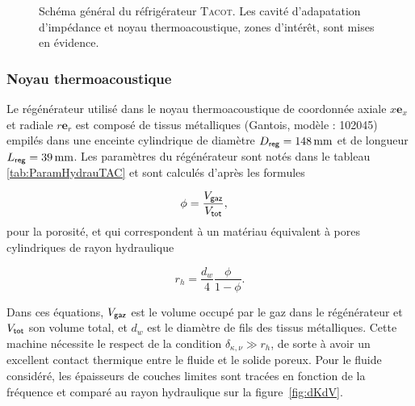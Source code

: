 \begin{figure}[!ht]
    \centering
    
    \caption[Schéma général du réfrigérateur \textsc{Tacot} et mise en évidence des zones d'intérêt pour cette thèse]{Schéma général du réfrigérateur \textsc{Tacot}. Les \colorbox{MatlabYellow}{cavité d'adapatation d'impédance} et \colorbox{MatlabOrange}{noyau thermoacoustique}, zones d'intérêt, sont mises en évidence.}
    \label{fig:SchemaGeneralTACOT}
\end{figure}



\subsubsection{Noyau thermoacoustique}

Le régénérateur utilisé dans le noyau thermoacoustique de coordonnée axiale $x \mathbf e_x$ et radiale $r \mathbf e_r$ est composé de tissus métalliques (Gantois, modèle : 102045) empilés dans une enceinte cylindrique de diamètre $D_{\sf reg}=\qty{148}{\mm}$ et de longueur $L_{\sf reg}=\qty{39}{\mm}$. Les paramètres du régénérateur sont notés dans le tableau \ref{tab:ParamHydrauTAC} et sont calculés d'après les formules 

\begin{align}
	\phi &= \frac{V_{\sf gaz}}{V_{\sf tot}}, \label{eq:Porosite_Volume}%
\end{align}
pour la porosité, et qui correspondent à un matériau équivalent à pores cylindriques de rayon hydraulique

\begin{equation}
	r_h = \frac{d_w}{4}\frac{\phi}{1-\phi}.
	\label{eq:DefRayonHydrauGantois}
\end{equation}

Dans ces équations, $V_{\sf gaz}$ est le volume occupé par le gaz dans le régénérateur et $V_{\sf tot}$ son volume total, et $d_w$ est le diamètre de fils des tissus métalliques. Cette machine nécessite le respect de la condition $\delta_{\kappa,\nu} \gg r_h$, de sorte à avoir un excellent contact thermique entre le fluide et le solide poreux. Pour le fluide considéré, les épaisseurs de couches limites sont tracées en fonction de la fréquence et comparé au rayon hydraulique sur la figure~\ref{fig:dKdV}.

